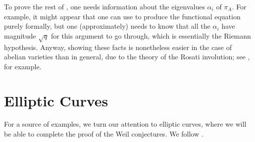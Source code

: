\documentclass{amsart}
\begin{document}
\begin{remark} \label{rem:go-no-further}
	To prove the rest of , one needs information about the eigenvalues $\alpha_i$ of $\pi_A$. For example, it might appear that one can use  to produce the functional equation purely formally, but one (approximately) needs to know that all the $\alpha_i$ have magnitude $\sqrt q$ for this argument to go through, which is essentially the Riemann hypothesis. Anyway, showing these facts is nonetheless easier in the case of abelian varieties than in general, due to the theory of the Rosati involution; see \cite[Section~I.14]{milne-av}, for example.
\end{remark}

\section{Elliptic Curves} \label{sec:ec}
For a source of examples, we turn our attention to elliptic curves, where we will be able to complete the proof of the Weil conjectures. We follow \cite[Section~V.2]{silverman}.
\end{document}
